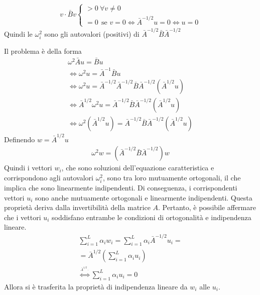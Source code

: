 \documentclass[Main.tex]{subfiles}
\begin{document}
\begin{dm}
\begin{enumerate}
\begin{osservazione}
\begin{gather*}
		v \cdot \bar B v \begin{cases}> 0 \ \forall v \neq 0 \\
		=0 \ \ \text{se } v= 0 \iff \bar A^{-1/2}u = 0 \iff u=0 \end{cases}
	\end{gather*}
	Quindi le $\omega_i^2$ sono gli autovalori (positivi) di $\bar A^{-1/2} \bar B \bar A ^{-1/2}$
\end{osservazione}
Il problema è della forma
\begin{gather}
	\omega^2 \bar A u = \bar B u \\ \iff \omega^2 u = \bar A^{-1} \bar B u \\
	\iff \omega^2 u = \bar A^{-1/2} \bar A^{-1/2} \bar B \bar A^{-1/2} (\bar A^{1/2} u)\\
	\iff \bar A^{1/2} \omega^2 u = \bar A^{-1/2} \bar B \bar A^{-1/2} (\bar A^{1/2} u)\\
	\iff \omega^2 ( \bar A^{1/2} u) = \bar A^{-1/2} \bar B \bar A^{-1/2} ( \bar A^{1/2}u)
\end{gather}
Definendo $w= \bar A^{1/2}u$
\begin{gather}
	\omega^2 w = (\bar A^{-1/2} \bar B \bar A^{-1/2})w
\end{gather}
Quindi i vettori $w_i$, che sono soluzioni dell'equazione caratteristica e corrispondono agli autovalori $\omega_i^2$, sono tra loro mutuamente ortogonali, il che implica che sono linearmente indipendenti. Di conseguenza, i corrispondenti vettori $u_i$ sono anche mutuamente ortogonali e linearmente indipendenti. Questa proprietà deriva dalla invertibilità della matrice $A$. Pertanto, è possibile affermare che i vettori $u_i$ soddisfano entrambe le condizioni di ortogonalità e indipendenza lineare.
\begin{gather}
	\sum_{i=1}^L \alpha_i w_ i = \sum_{i=1}^L \alpha_i \bar A^{-1/2} u_i =\\= \bar A^{1/2} \left( \sum_{i=1}^L \alpha _i u_i \right) \\
	\overset{\overset{  \bar A^{1/2}\cdot}{}}{\iff} \sum^L_{i=1} \alpha_i u_i =0
\end{gather}
Allora si è trasferita la proprietà di indipendenza lineare da $w_i$ alle $u_i$.


\end{enumerate}
\end{dm}
\end{document}
